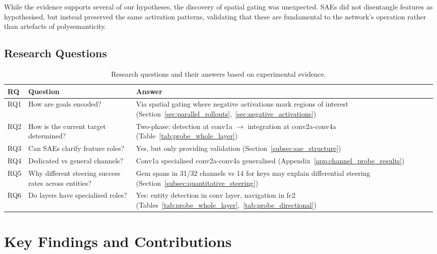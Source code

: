 While the evidence supports several of our hypotheses, the discovery of spatial gating was unexpected. SAEs did not disentangle features as hypothesised, but instead preserved the same activation patterns, validating that these are fundamental to the network's operation rather than artefacts of polysemanticity.

\subsection{Research Questions}

\begin{table}[h]
\centering
\caption[Research questions and answers]{Research questions and their answers based on experimental evidence.}
\label{tab:rq_outcomes}
\renewcommand{\arraystretch}{1.5} %
\begin{tabular}{p{}p{}p{}}
\toprule
\textbf{RQ} & \textbf{Question} & \textbf{Answer} \\
\midrule
RQ1 & How are goals encoded? & Via spatial gating where negative activations mark regions of interest (Section~\ref{sec:parallel_rollouts},~\ref{sec:negative_activations}) \\
RQ2 & How is the current target determined? & Two-phase: detection at conv1a $\rightarrow$  integration at conv2a-conv4a (Table~\ref{tab:probe_whole_layer}) \\
RQ3 & Can SAEs clarify feature roles? & Yes, but only providing validation (Section~\ref{subsec:sae_structure}) \\
RQ4 & Dedicated vs general channels? & Conv1a specialised conv2a-conv4a generalised (Appendix~\ref{app:channel_probe_results}) \\
RQ5 & Why different steering success rates across entities? & Gem spans in 31/32 channels vs 14 for keys may explain differential steering (Section~\ref{subsec:quantitative_steering}) \\
RQ6 & Do layers have specialised roles? & Yes: entity detection in conv layer, navigation in fc2 (Tables~\ref{tab:probe_whole_layer},~\ref{tab:probe_directional}) \\
\bottomrule
\end{tabular}
\end{table}

\section{Key Findings and Contributions}
\label{sec:contributions}

